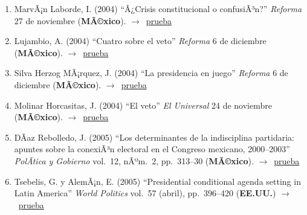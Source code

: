 \documentclass[12 pt, letter]{article}
\newenvironment{CitasMiTrabajo}{
    \begin{footnotesize}
    \begin{enumerate}[label={\footnotesize\emph{cita~\arabic*}},ref=\arabic*] %
        \setlength{\itemsep}{.1\itemsep}
        \setlength{\parskip}{.1\parskip}
    }{\end{enumerate}\end{footnotesize}}
\begin{document}

        \begin{CitasMiTrabajo}

        \item MarvÃ¡n Laborde, I. (2004)
        ``Â¿Crisis constitucional o confusiÃ³n?'' \emph{Reforma} 27 de noviembre (\textbf{MÃ©xico}). $\rightarrow$~\href{http://ericmagar.com/cv/cites/magarWeldonVeto/marvan.pdf}{prueba}

        \item Lujambio, A. (2004) ``Cuatro sobre el veto''
        \emph{Reforma} 6 de diciembre (\textbf{MÃ©xico}). $\rightarrow$~\href{http://ericmagar.com/cv/cites/magarWeldonVeto/luj.pdf}{prueba}

        \item Silva Herzog MÃ¡rquez, J. (2004) ``La presidencia en
        juego'' \emph{Reforma} 6 de diciembre (\textbf{MÃ©xico}). $\rightarrow$~\href{http://ericmagar.com/cv/cites/magarWeldonVeto/jshm.pdf}{prueba}

        \item Molinar Horcasitas, J. (2004)
        ``El veto'' \emph{El Universal} 24 de noviembre (\textbf{MÃ©xico}). $\rightarrow$~\href{http://ericmagar.com/cv/cites/magarWeldonVeto/moli.pdf}{prueba}

        \item DÃ­az Rebolledo, J. (2005)
        ``Los determinantes de la indisciplina partidaria: apuntes sobre la conexiÃ³n electoral en el Congreso mexicano, 2000--2003''
        \emph{PolÃ­tica y Gobierno} vol.\ 12, nÃºm.\ 2, pp.\ 313--30 (\textbf{MÃ©xico}). $\rightarrow$~\href{http://ericmagar.com/cv/cites/magarWeldonVeto/diazrebolledo2005pyg.pdf}{prueba}

        \item Tsebelis, G. y AlemÃ¡n, E. (2005)
        ``Presidential conditional agenda setting in Latin America'' \emph{World Politics} vol.\ 57 (abril), pp.\ 396--420 (\textbf{EE.UU.}) $\rightarrow$~\href{http://ericmagar.com/cv/cites/magarWeldonVeto/tsebal.pdf}{prueba}


\end{CitasMiTrabajo}
\end{document}
